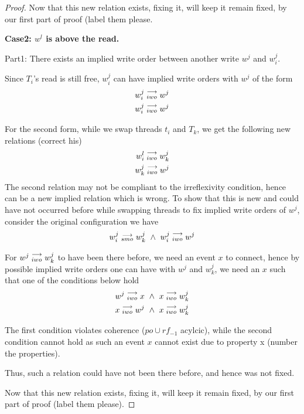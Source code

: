 \begin{proof}
                    Now that this new relation exists, fixing it, will keep it remain fixed, by our first part of proof (label them please. 
                    
            
            \textbf{Case2: $w^l$ is above the read.}
                
                Part1: There exists an implied write order between another write $w^j$ and $w_i^j$.

                Since $T_i$'s read is still free, $w_i^j$ can have implied write orders with $w^j$ of the form
                \begin{align}
                    w_i^j\stackrel{\longrightarrow}{_{iwo}}w^j \\
                    w_i^j\stackrel{\longrightarrow}{_{iwo}}w^j 
                \end{align}


                For the second form, while we swap threads $t_i$ and $T_k$, we get the following new relations (correct his)
                \begin{align}
                    w_i^l\stackrel{\longrightarrow}{_{iwo}}w_k^j \\
                    w_k^j\stackrel{\longrightarrow}{_{iwo}}w^j
                \end{align}
                The second relation may not be compliant to the irreflexivity condition, hence can be a new implied relation which is wrong. To show that this is new and could have not occurred before while swapping threads to fix implied write orders of $w^j$, consider the original configuration we have 
                \begin{align}
                    \reln{w_i^j}{smo}{w_k^j} \ \wedge \ \reln{w_i^j}{iwo}{w^j}
                \end{align}

                For $w^j\stackrel{\longrightarrow}{_{iwo}}w_k^j$ to have been there before, we need an event $x$ to connect, hence by possible implied write orders one can have with $w^j$ and $w_k^j$, we need an $x$ such that one of the conditions below hold
                \begin{align}
                    w^j\stackrel{\longrightarrow}{_{iwo}}x \ \wedge \ x\stackrel{\longrightarrow}{_{iwo}}w_k^j \\ 
                    x\stackrel{\longrightarrow}{_{iwo}}w^j \ \wedge \ x\stackrel{\longrightarrow}{_{iwo}}w_k^j
                \end{align}

                The first condition violates coherence ($po \cup rf_{-1}$ acylcic), while the second condition cannot hold as such an event $x$ cannot exist due to property x (number the properties).
                
                Thus, such a relation could have not been there before, and hence was not fixed. 

                Now that this new relation exists, fixing it, will keep it remain fixed, by our first part of proof (label them please).


        \end{proof}

        

   